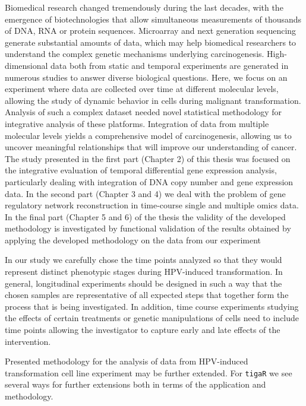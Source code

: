 
\begin{conclusion}

 Biomedical research changed tremendously during the last decades, with the emergence of biotechnologies that allow simultaneous measurements of thousands of DNA, RNA or protein sequences. Microarray and next generation sequencing generate substantial amounts of data, which may help biomedical researchers to understand the complex genetic mechanisms underlying carcinogenesis. High-dimensional data both from static and temporal experiments are generated in numerous studies to answer diverse biological questions. Here, we focus on an experiment where data are collected over time at different molecular levels, allowing the study of dynamic behavior in cells during malignant transformation. Analysis of such a complex dataset needed novel statistical methodology for integrative analysis of these platforms. Integration of data from multiple molecular levels yields a comprehensive model of carcinogenesis, allowing us to uncover meaningful relationships that will improve our understanding of cancer. The study presented in the first part (Chapter 2) of this thesis was focused on the integrative evaluation of temporal differential gene expression analysis, particularly dealing with integration of DNA copy number and gene expression data. In the second part (Chapter 3 and 4) we deal with the problem of gene regulatory network reconstruction in time-course single and multiple omics data. In the final part (Chapter 5 and 6) of the thesis the validity of the developed methodology is investigated by functional validation of the results obtained by applying the developed methodology on the data from our experiment 

In our study we carefully chose the time points analyzed so that they would represent distinct phenotypic stages during HPV-induced transformation. In general, longitudinal experiments should be designed in such a way that the chosen samples are representative of all expected steps that together form the process that is being investigated. In addition, time course experiments studying the effects of certain treatments or genetic manipulations of cells need to include time points allowing the investigator to capture early and late effects of the intervention.

Presented methodology for the analysis of data from HPV-induced transformation cell line experiment may be further extended. For {\tt tigaR} we see several ways for further extensions both in terms of the application and methodology. 
\begin{compactitem}


\end{compactitem}
\end{conclusion}
